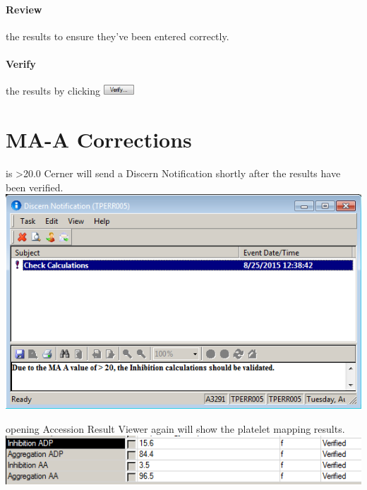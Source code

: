 \paragraph{Review} the results to ensure they've been entered correctly.
\paragraph{Verify} the results by clicking \includegraphics[height=1em]{graphics/verify.png}

\bigskip
\section{MA-A Corrections}
 is >20.0 Cerner will send a Discern Notification shortly after the results have been verified.\\
\vspace{.5em}
\includegraphics[width=.8\linewidth]{graphics/discern_notification.png}

 opening Accession Result Viewer again will show the platelet mapping results.\\
\vspace{.5em}
\includegraphics[width=\linewidth]{graphics/platelet_mapping_results}

